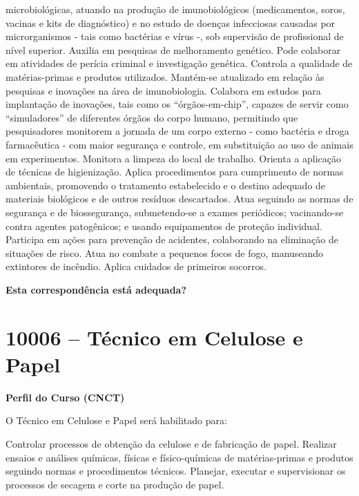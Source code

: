 \documentclass[
]{article}
\begin{document}
microbiológicas, atuando na produção de imunobiológicos (medicamentos,
soros, vacinas e kits de diagnóstico) e no estudo de doenças infecciosas
causadas por microrganismos - tais como bactérias e vírus -, sob
supervisão de profissional de nível superior. Auxilia em pesquisas de
melhoramento genético. Pode colaborar em atividades de perícia criminal
e investigação genética. Controla a qualidade de matérias-primas e
produtos utilizados. Mantém-se atualizado em relação às pesquisas e
inovações na área de imunobiologia. Colabora em estudos para implantação
de inovações, tais como os ``órgãos-em-chip'', capazes de servir como
``simuladores'' de diferentes órgãos do corpo humano, permitindo que
pesquisadores monitorem a jornada de um corpo externo - como bactéria e
droga farmacêutica - com maior segurança e controle, em substituição ao
uso de animais em experimentos. Monitora a limpeza do local de trabalho.
Orienta a aplicação de técnicas de higienização. Aplica procedimentos
para cumprimento de normas ambientais, promovendo o tratamento
estabelecido e o destino adequado de materiais biológicos e de outros
resíduos descartados. Atua seguindo as normas de segurança e de
biossegurança, submetendo-se a exames periódicos; vacinando-se contra
agentes patogênicos; e usando equipamentos de proteção individual.
Participa em ações para prevenção de acidentes, colaborando na
eliminação de situações de risco. Atua no combate a pequenos focos de
fogo, manuseando extintores de incêndio. Aplica cuidados de primeiros
socorros.

\begin{Form}
\textbf{Esta correspondência está adequada?} \\ 
\end{Form}

\newpage
\section{ 10006 -- Técnico em Celulose e Papel }

\textbf{Perfil do Curso (CNCT)}

O Técnico em Celulose e Papel será habilitado para:

Controlar processos de obtenção da celulose e de fabricação de papel.
Realizar ensaios e análises químicas, físicas e físico-químicas de
matérias-primas e produtos seguindo normas e procedimentos técnicos.
Planejar, executar e supervisionar os processos de secagem e corte na
produção de papel.
\end{document}
